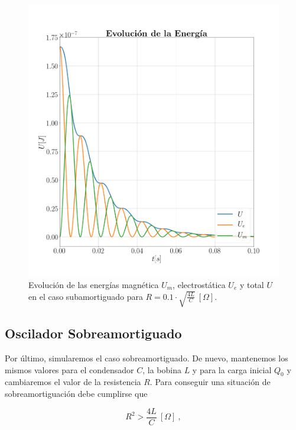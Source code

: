 \documentclass[journal]{IEEEtran}
\begin{document}
\begin{figure}[!htb]
    \centering
    \includegraphics[width=\linewidth,trim={40 70 70 105},clip]{energiasubamortiguado.png}
    \caption{Evolución de las energías magnética $U_m$, electrostática $U_e$ y total $U$ en el caso subamortiguado para $R=0.1 \cdot\sqrt{\frac{4L}{C}}~[\Omega]$.}
    \label{fig:energiasubamortiguado}
\end{figure}

\clearpage

\subsection{Oscilador Sobreamortiguado}
\label{subsec:osciladorsobreamortiguado}

Por último, simularemos el caso sobreamortiguado. De nuevo, mantenemos los mismos valores para el condensador $C$, la bobina $L$ y para la carga inicial $Q_0$ y cambiaremos el valor de la resistencia $R$. Para conseguir una situación de sobreamortiguación debe cumplirse que

\begin{equation}
R^2 > \frac{4L}{C}~[\Omega]~,
\end{equation}
\end{document}
